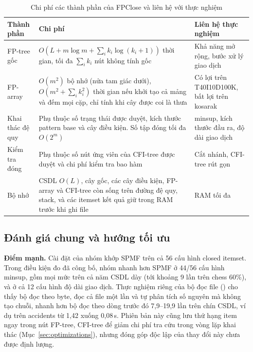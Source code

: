 \begin{table}[!htb]
\caption{Chi phí các thành phần của FPClose và liên hệ với thực nghiệm}
\label{tab:complexity}
\centering
\footnotesize\setlength{\tabcolsep}{3pt}
\begin{tabular}{@{}>{\raggedright\arraybackslash}p{}>{\raggedright\arraybackslash}p{}>{\raggedright\arraybackslash}p{}@{}}
\hline
Thành phần & Chi phí & Liên hệ thực nghiệm \\
\hline
FP-tree gốc & $O(L + m\log m + \sum_i k_i\log(k_i+1))$ thời gian, tối đa $\sum_i k_i$ nút không tính gốc &
Khả năng mở rộng, bước xử lý giao dịch \\
FP-array & $O(m^2)$ bộ nhớ (nửa tam giác dưới), $O(m^2 + \sum_i k_i^2)$ thời gian nếu khởi tạo cả mảng và đếm mọi
cặp, chỉ tính khi cây được coi là thưa & Có lợi trên T40I10D100K, bất lợi trên kosarak \\
Khai thác đệ quy & Phụ thuộc số trạng thái được duyệt, kích thước pattern base và cây điều kiện. Số tập đóng tối đa
$O(2^m)$ & minsup, kích thước đầu ra, độ dài giao dịch \\
Kiểm tra đóng & Phụ thuộc số nút ứng viên của CFI-tree được duyệt và chi phí kiểm tra bao hàm & Cắt nhánh, CFI-tree
rút gọn \\
Bộ nhớ & CSDL $O(L)$, cây gốc, các cây điều kiện, FP-array và CFI-tree còn sống trên đường đệ quy, stack, và các
itemset kết quả giữ trong RAM trước khi ghi file & RAM tối đa \\
\hline
\end{tabular}
\end{table}

\subsection{Đánh giá chung và hướng tối ưu}
\label{sec:discussion}

\textbf{Điểm mạnh.} Cài đặt của nhóm khớp SPMF trên cả 56 cấu hình closed itemset. Trong điều kiện đo đã công bố,
nhóm nhanh hơn SPMF ở 44/56 cấu hình minsup, gồm mọi mức trên cả năm CSDL dày (tới khoảng 9 lần trên chess 60\%), và
ở cả 12 cấu hình độ dài giao dịch. Thực nghiệm riêng của bộ đọc file () cho thấy bộ
đọc theo byte, đọc cả file một lần và tự phân tích số nguyên mà không tạo chuỗi, nhanh hơn bộ đọc theo dòng trước đó
7{,}9–19{,}9 lần trên chín CSDL, ví dụ trên accidents từ 1{,}42 xuống 0{,}08\,s. Phiên bản này cũng lưu thứ hạng item
ngay trong nút FP-tree, CFI-tree để giảm chi phí tra cứu trong vòng lặp khai thác (Mục~\ref{sec:optimizations}),
nhưng đóng góp độc lập của thay đổi này chưa được định lượng.

